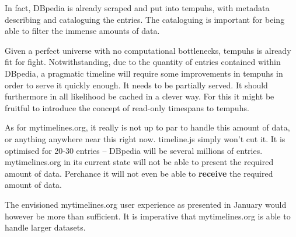 In fact, DBpedia is already scraped and put into tempuhs, with metadata 
describing and cataloguing the entries. The cataloguing is important for being
able to filter the immense amounts of data.

Given a perfect universe with no computational bottlenecks, tempuhs is already 
fit for fight. Notwithstanding, due to the quantity of entries contained 
within DBpedia, a pragmatic timeline will require some improvements in tempuhs 
in order to serve it quickly enough. It needs to be partially served. It 
should furthermore in all likelihood be cached in a clever way. For this it 
might be fruitful to introduce the concept of read-only timespans to tempuhs.

As for mytimelines.org, it really is not up to par to handle this amount of 
data, or anything anywhere near this right now. timeline.js simply won't cut 
it. It is optimised for 20-30 entries\cite{timelinejsfaq} -- DBpedia will be 
several millions of entries. mytimelines.org in its current state will not be 
able to present the required amount of data. Perchance it will not even be 
able to \textbf{receive} the required amount of data.

The envisioned mytimelines.org user experience as presented in 
January\cite{timelinesjanuary} would however be more than sufficient. It is 
imperative that mytimelines.org is able to handle larger datasets.
